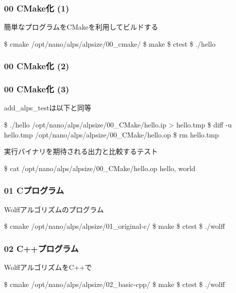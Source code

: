 \begin{frame}[fragile]
  \frametitle{00 CMake化 (1)}
  簡単なプログラムをCMakeを利用してビルドする
\begin{semiverbatim}
\$ cmake /opt/nano/alps/alpsize/00_cmake/
\$ make
\$ ctest
\$ ./hello
\end{semiverbatim}
\end{frame}

\begin{frame}[fragile,shrink=10]
  \frametitle{00 CMake化 (2)}
\end{frame}

\begin{frame}[fragile]
  \frametitle{00 CMake化 (3)}
add\_alps\_testは以下と同等
\begin{semiverbatim}
\$ ./hello /opt/nano/alps/alpsize/00_CMake/hello.ip > hello.tmp
\$ diff -u hello.tmp /opt/nano/alps/alpsize/00_CMake/hello.op
\$ rm hello.tmp
\end{semiverbatim}
実行バイナリを期待される出力と比較するテスト
\begin{semiverbatim}
\$ cat /opt/nano/alps/alpsize/00_CMake/hello.op
hello, world
\end{semiverbatim}

\end{frame}

\begin{frame}[fragile]
  \frametitle{01 Cプログラム}
  Wolffアルゴリズムのプログラム
\begin{semiverbatim}
\$ cmake /opt/nano/alps/alpsize/01_original-c/
\$ make
\$ ctest
\$ ./wolff
\end{semiverbatim}
\end{frame}

\begin{frame}[fragile]
  \frametitle{02 C++プログラム}
  WolffアルゴリズムをC++で
\begin{semiverbatim}
\$ cmake /opt/nano/alps/alpsize/02_basic-cpp/
\$ make
\$ ctest
\$ ./wolff
\end{semiverbatim}
\end{frame}

